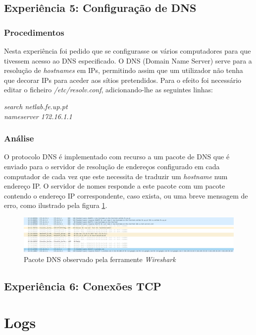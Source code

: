 \documentclass{article}
\begin{document}
\newpage

\subsection{Experiência 5: Configuração de DNS}
\subsubsection{Procedimentos}
Nesta experiência foi pedido que se configurasse os vários computadores para que tivessem acesso ao DNS especificado. O DNS (Domain Name Server) serve para a resolução de \textit{hostnames} em IPs, permitindo assim que um utilizador não tenha que decorar IPs para aceder aos sítios pretendidos. Para o efeito foi necessário editar o ficheiro \textit{/etc/resolv.conf}, adicionando-lhe as seguintes linhas:

\textit{search netlab.fe.up.pt}\\
\textit{nameserver 172.16.1.1}

\subsubsection{Análise}
O protocolo DNS é implementado com recurso a um pacote de DNS que é enviado para o servidor de resolução de endereços configurado em cada computador de cada vez que este necessita de traduzir um \textit{hostname} num endereço IP. O servidor de nomes responde a este pacote com um pacote contendo o endereço IP correspondente, caso exista, ou uma breve mensagem de erro, como ilustrado pela figura \ref{fig:dns}.

\begin{figure}
\centering
\includegraphics[width=1.0\textwidth]{dns.png}
\caption{Pacote DNS observado pela ferramente \textit{Wireshark} }
\label{fig:dns}
\end{figure}

\subsection{Experiência 6: Conexões TCP}

\newpage

\appendix
\section{Logs}
\end{document}

